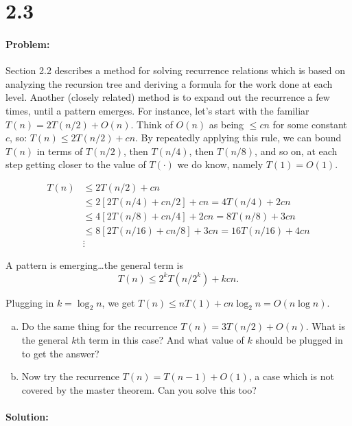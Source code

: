 \documentclass[12pt]{article}
\newcommand{\BigO}[1]{\ensuremath{O(#1)}}
\begin{document}
\section*{2.3}
\paragraph{Problem:}
Section 2.2 describes a method for solving recurrence relations which is
based on analyzing the recursion tree and deriving a formula for the
work done at each level.  Another (closely related) method is to expand
out the recurrence a few times, until a pattern emerges. For instance,
let’s start with the familiar $T(n) = 2T(n/2) + \BigO{n}$. Think of
$\BigO{n}$ as being $\leq cn$ for some constant $c$,
so: $T(n) \leq 2T(n/2) + cn$.  By repeatedly applying this rule, we can
bound $T(n)$ in terms of $T(n/2)$, then $T(n/4)$, then $T(n/8)$, and so
on, at each step getting closer to the value of $T(\cdot)$ we do know,
namely $T(1) = \BigO{1}$.

\begin{align*}
T (n) &\leq 2T (n/2) + cn \\
&\leq 2[2T(n/4) + cn/2] + cn = 4T(n/4) + 2cn \\
&\leq 4[2T(n/8) + cn/4] + 2cn = 8T(n/8) + 3cn \\
&\leq 8[2T(n/16) + cn/8] + 3cn = 16T(n/16) + 4cn \\
& \vdots
\end{align*}

A pattern is emerging\ldots the general term is 
\[T(n) \leq 2^kT(n/2^k) + kcn.\]

Plugging in $k = \log_2{n}$, we get $T(n) \leq nT(1) + cn\log_2{n} = \BigO{n\log{n}}.$

\begin{enumerate}[(a)]
\item Do the same thing for the recurrence $T(n) = 3T(n/2) + \BigO{n}$. What
is the general $k$th term
in this case? And what value of $k$ should be plugged in to get the
answer?

\item Now try the recurrence $T(n) = T(n - 1) + \BigO{1}$, a case which is not
covered by the master theorem. Can you solve this too?
\end{enumerate}

\paragraph{Solution:}
\end{document}
